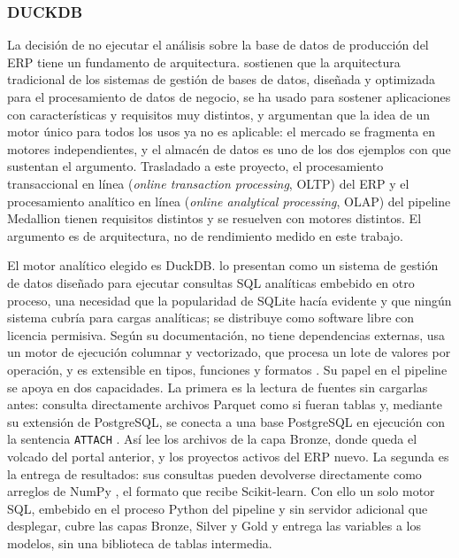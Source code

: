\subsubsection{DUCKDB}

La decisión de no ejecutar el análisis sobre la base de datos de producción del ERP tiene un fundamento de arquitectura. \textcite{Stonebraker2005} sostienen que la arquitectura tradicional de los sistemas de gestión de bases de datos, diseñada y optimizada para el procesamiento de datos de negocio, se ha usado para sostener aplicaciones con características y requisitos muy distintos, y argumentan que la idea de un motor único para todos los usos ya no es aplicable: el mercado se fragmenta en motores independientes, y el almacén de datos es uno de los dos ejemplos con que sustentan el argumento. Trasladado a este proyecto, el procesamiento transaccional en línea (\textit{online transaction processing}, OLTP) del ERP y el procesamiento analítico en línea (\textit{online analytical processing}, OLAP) del pipeline Medallion tienen requisitos distintos y se resuelven con motores distintos. El argumento es de arquitectura, no de rendimiento medido en este trabajo.

El motor analítico elegido es DuckDB. \textcite{Raasveldt2019} lo presentan como un sistema de gestión de datos diseñado para ejecutar consultas SQL analíticas embebido en otro proceso, una necesidad que la popularidad de SQLite hacía evidente y que ningún sistema cubría para cargas analíticas; se distribuye como software libre con licencia permisiva. Según su documentación, no tiene dependencias externas, usa un motor de ejecución columnar y vectorizado, que procesa un lote de valores por operación, y es extensible en tipos, funciones y formatos \parencite{DuckDBWhy}. Su papel en el pipeline se apoya en dos capacidades. La primera es la lectura de fuentes sin cargarlas antes: consulta directamente archivos Parquet como si fueran tablas \parencite{DuckDBPython} y, mediante su extensión de PostgreSQL, se conecta a una base PostgreSQL en ejecución con la sentencia \texttt{ATTACH} \parencite{DuckDBPostgres}. Así lee los archivos de la capa Bronze, donde queda el volcado del portal anterior, y los proyectos activos del ERP nuevo. La segunda es la entrega de resultados: sus consultas pueden devolverse directamente como arreglos de NumPy \parencite{DuckDBPython}, el formato que recibe Scikit-learn. Con ello un solo motor SQL, embebido en el proceso Python del pipeline y sin servidor adicional que desplegar, cubre las capas Bronze, Silver y Gold y entrega las variables a los modelos, sin una biblioteca de tablas intermedia.

